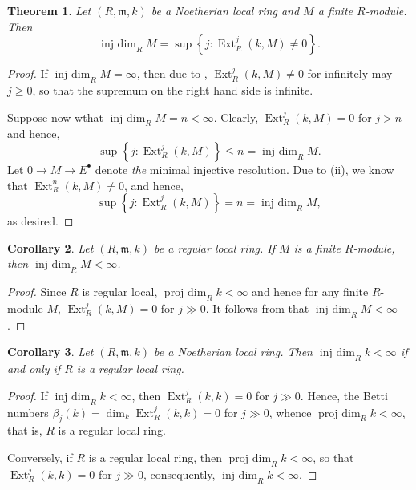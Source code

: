 \documentclass[10pt]{article}
\theoremstyle{thmstyle}
\newtheorem{theorem}{Theorem}[section]
\theoremstyle{defstyle}
\newtheorem{corollary}[theorem]{Corollary}
\newcommand{\frakm}{\mathfrak{m}} %
\renewcommand{\le}{\leqslant}
\renewcommand{\ge}{\geqslant}
\newcommand{\Ext}{\operatorname{Ext}}
\newcommand{\projdim}{\operatorname{proj~dim}}
\newcommand{\injdim}{\operatorname{inj~dim}}
\begin{document}
\begin{theorem}
    Let $(R,\frakm, k)$ be a Noetherian local ring and $M$ a finite $R$-module. Then 
    \begin{equation*}
        \injdim_R M = \sup\left\{j\colon \Ext^j_R(k, M)\ne 0\right\}.
    \end{equation*}
\end{theorem}
\begin{proof}
    If $\injdim_R M = \infty$, then due to , $\Ext^j_R(k, M)\ne 0$ for infinitely may $j\ge 0$, so that the supremum on the right hand side is infinite.

    Suppose now wthat $\injdim_R M = n < \infty$. Clearly, $\Ext^j_R(k, M) = 0$ for $j > n$ and hence, 
    \begin{equation*}
        \sup\left\{j\colon \Ext^j_R(k, M)\right\}\le n = \injdim_R M.
    \end{equation*}
    Let $0\to M\to E^\bullet$ denote \emph{the} minimal injective resolution. Due to  (ii), we know that $\Ext^n_R(k, M)\ne 0$, and hence, 
    \begin{equation*}
        \sup\left\{j\colon\Ext^j_R(k, M)\right\} = n = \injdim_R M,
    \end{equation*}
    as desired.
\end{proof}

\begin{corollary}
    Let $(R,\frakm, k)$ be a regular local ring. If $M$ is a finite $R$-module, then $\injdim_R M < \infty$.
\end{corollary}
\begin{proof}
    Since $R$ is regular local, $\projdim_R k < \infty$ and hence for any finite $R$-module $M$, $\Ext^j_R(k, M) = 0$ for $j\gg 0$. It follows from  that $\injdim_R M < \infty$.
\end{proof}

\begin{corollary}
    Let $(R,\frakm, k)$ be a Noetherian local ring. Then $\injdim_R k < \infty$ if and only if $R$ is a regular local ring.
\end{corollary}
\begin{proof}
    If $\injdim_R k < \infty$, then $\Ext^j_R(k, k) = 0$  for $j\gg 0$. Hence, the Betti numbers $\beta_j(k) = \dim_k\Ext^j_R(k, k) = 0$ for $j\gg 0$, whence $\projdim_R k < \infty$, that is, $R$ is a regular local ring.

    Conversely, if $R$ is a regular local ring, then $\projdim_R k < \infty$, so that $\Ext^j_R(k, k) = 0$ for $j\gg 0$, consequently, $\injdim_R k < \infty$.
\end{proof}
\end{document}
